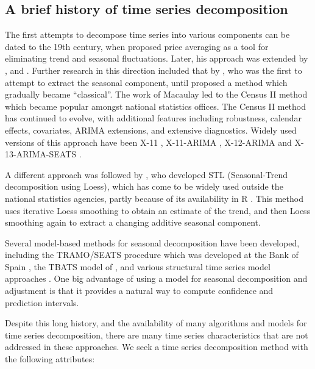 \documentclass[11pt,a4paper,]{article}
\begin{document}
\hypertarget{a-brief-history-of-time-series-decomposition}{%
\subsection{A brief history of time series decomposition}\label{a-brief-history-of-time-series-decomposition}}

The first attempts to decompose time series into various components can be dated to the 19th century, when \textcite{Poynting1884} proposed price averaging as a tool for eliminating trend and seasonal fluctuations. Later, his approach was extended by \textcite{hooker1901suspension}, \textcite{spencer1904graduation} and \textcite{anderson1914nochmals}. Further research in this direction included that by \textcite{copeland1915statistical}, who was the first to attempt to extract the seasonal component, until \textcite{macaulay1930smooth} proposed a method which gradually became ``classical''. The work of Macaulay led to the Census II method \autocite{shiskin1957electronic} which became popular amongst national statistics offices. The Census II method has continued to evolve, with additional features including robustness, calendar effects, covariates, ARIMA extensions, and extensive diagnostics. Widely used versions of this approach have been X-11 \autocite{shishkin1967x}, X-11-ARIMA \autocite{dagum1988x11arima,ladiray2001seasonal}, X-12-ARIMA \autocite{findley1998new} and X-13-ARIMA-SEATS \autocite{findley2005some}.

A different approach was followed by \textcite{cleveland1990stl}, who developed STL (Seasonal-Trend decomposition using Loess), which has come to be widely used outside the national statistics agencies, partly because of its availability in R \autocite{R}. This method uses iterative Loess smoothing to obtain an estimate of the trend, and then Loess smoothing again to extract a changing additive seasonal component.

Several model-based methods for seasonal decomposition have been developed, including the TRAMO/SEATS procedure which was developed at the Bank of Spain \autocite{Gomez2001}, the TBATS model of \textcite{de2011forecasting}, and various structural time series model approaches \autocite{harvey1990forecasting,Commandeur2011}. One big advantage of using a model for seasonal decomposition and adjustment is that it provides a natural way to compute confidence and prediction intervals.

Despite this long history, and the availability of many algorithms and models for time series decomposition, there are many time series characteristics that are not addressed in these approaches. We seek a time series decomposition method with the following attributes:
\end{document}
